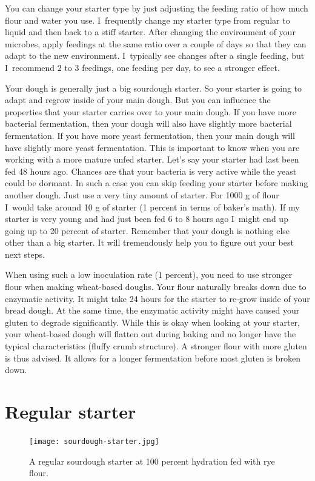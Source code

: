 You can change your starter type by just adjusting the feeding ratio of how
much flour and water you use. I~frequently change my starter type from
regular to liquid and then back to a stiff starter. After changing the
environment of your microbes, apply feedings at the same ratio over a couple of
days so that they can adapt to the new environment. I~typically see
changes after a single feeding, but I~recommend 2 to 3 feedings, one feeding per
day, to see a stronger effect.

Your dough is generally just a big sourdough starter. So your starter is going
to adapt and regrow inside of your main dough. But you can influence the
properties that your starter carries over to your main dough. If you have more
bacterial fermentation, then your dough will also have slightly more bacterial
fermentation. If you have more yeast fermentation, then your main dough will
have slightly more yeast fermentation. This is important to know when you are
working with a more mature unfed starter. Let's say your starter had last been
fed 48 hours ago. Chances are that your bacteria is very active while the
yeast could be dormant. In such a case you can skip feeding your starter
before making another dough. Just use a very tiny amount of starter. For 1000 g
of flour I~would take around 10 g of starter (1 percent in terms of baker's
math). If my starter is very young and had just been fed 6 to 8 hours ago I~might
end up going up to 20 percent of starter. Remember that your dough is nothing
else other than a big starter. It will tremendously help you to figure out
your best next steps.

When using such a low inoculation rate (1 percent), you need to use stronger
flour when making wheat-based doughs. Your flour naturally breaks down due
to enzymatic activity. It might take 24 hours for the starter to re-grow
inside of your bread dough. At the same time, the enzymatic activity might
have caused your gluten to degrade significantly. While this is okay
when looking at your starter, your wheat-based dough will flatten
out during baking and no longer have the typical characteristics (fluffy crumb
structure). A stronger flour with more gluten is thus advised. It allows for
a longer fermentation before most gluten is broken down.

\section{Regular starter}

\begin{figure}[!htb]
  \texttt{[image: sourdough-starter.jpg]}
  \caption{A regular sourdough starter at 100 percent hydration fed with rye
  flour.}%
  \label{fig:regular-sourdough-starter}
\end{figure}

